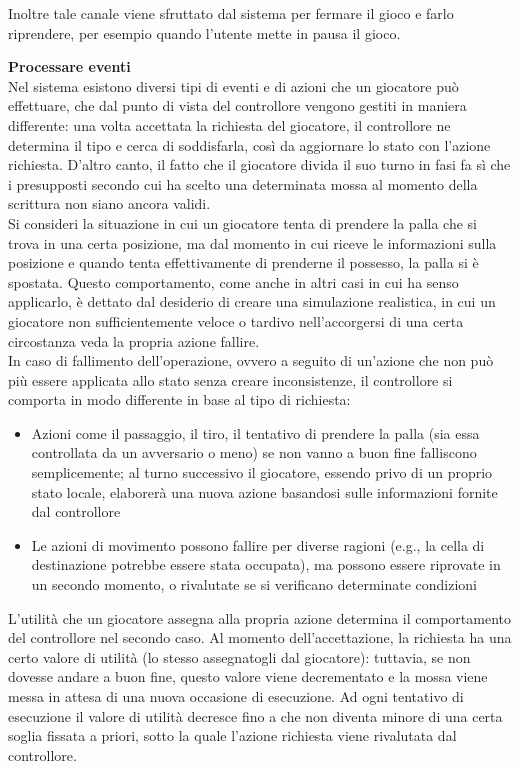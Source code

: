 Inoltre tale canale viene sfruttato dal sistema per fermare il gioco e farlo riprendere, per esempio quando l'utente mette in pausa il gioco.

\textbf{Processare eventi}\\

Nel sistema esistono diversi tipi di eventi e di azioni che un giocatore può effettuare, che dal punto di vista del controllore vengono gestiti in maniera differente: una volta accettata la richiesta del giocatore, il controllore ne determina il tipo e cerca di soddisfarla, così da aggiornare lo stato con l'azione richiesta. D'altro canto, il fatto che il giocatore divida il suo turno in fasi fa sì che i presupposti secondo cui ha scelto una determinata mossa al momento della scrittura non siano ancora validi.\\

Si consideri la situazione in cui un giocatore tenta di prendere la palla che si trova in una certa posizione, ma dal momento in cui riceve le informazioni sulla posizione e quando tenta effettivamente di prenderne il possesso, la palla si è spostata. Questo comportamento, come anche in altri casi in cui ha senso applicarlo, è dettato dal desiderio di creare una simulazione realistica, in cui un giocatore non sufficientemente veloce o tardivo nell'accorgersi di una certa circostanza veda la propria azione fallire.\\

In caso di fallimento dell'operazione, ovvero a seguito di un'azione che non può più essere applicata allo stato senza creare inconsistenze, il controllore si comporta in modo differente in base al tipo di richiesta:

\begin{itemize}
	\item Azioni come il passaggio, il tiro, il tentativo di prendere la palla (sia essa controllata da un avversario o meno) se non vanno a buon fine falliscono semplicemente; al turno successivo il giocatore, essendo privo di un proprio stato locale, elaborerà una nuova azione basandosi sulle informazioni fornite dal controllore
	\item Le azioni di movimento possono fallire per diverse ragioni (e.g., la cella di destinazione potrebbe essere stata occupata), ma possono essere riprovate in un secondo momento, o rivalutate se si verificano determinate condizioni
\end{itemize}

L'utilità che un giocatore assegna alla propria azione determina il comportamento del controllore nel secondo caso. Al momento dell'accettazione, la richiesta ha una certo valore di utilità (lo stesso assegnatogli dal giocatore): tuttavia, se non dovesse andare a buon fine, questo valore viene decrementato e la mossa viene messa in attesa di una nuova occasione di esecuzione. Ad ogni tentativo di esecuzione il valore di utilità decresce fino a che non diventa minore di una certa soglia fissata a priori, sotto la quale l'azione richiesta viene rivalutata dal controllore.\\

